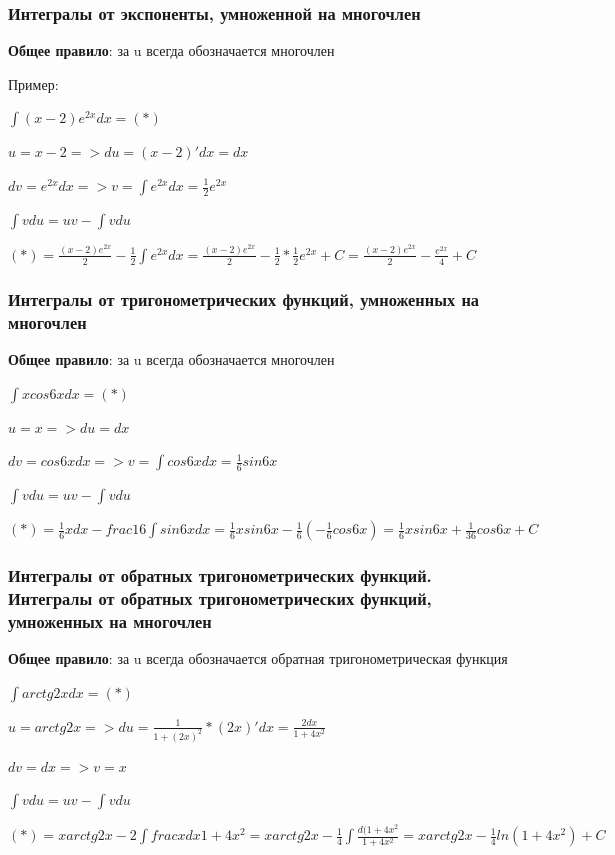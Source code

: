 \documentclass[12pt,a4paper]{article}
\begin{document}
\subsubsection{Интегралы от экспоненты, умноженной на многочлен}

\textbf{Общее правило}: за u всегда обозначается многочлен

Пример:

$\int{(x-2)e^{2x}dx} = (*) $

$ u = x-2 => du = (x-2)'dx = dx $

$ dv = e^{2x}dx => v = \int{e^{2x}dx} = \frac{1}{2}e^{2x} $

$ \int{vdu} = uv - \int{vdu} $

$ (*) = \frac{(x-2)e^{2x}}{2} - \frac{1}{2}\int{e^{2x}}dx = \frac{(x-2)e^{2x}}{2} - \frac{1}{2}* \frac{1}{2}e^{2x} + C 
= \frac{(x-2)e^{2x}}{2} - \frac{e^{2x}}{4} + C $

\subsubsection{Интегралы от тригонометрических функций, умноженных на многочлен}

\textbf{Общее правило}: за u всегда обозначается многочлен

$ \int{x cos6xdx} = (*) $ 

$ u = x => du = dx $

$ dv = cos6xdx => v = \int{cos6xdx} = \frac{1}{6}sin6x $

$ \int{vdu} = uv - \int{vdu} $

$ (*) = \frac{1}{6}xdx - frac{1}{6}\int{sin6xdx} 
= \frac{1}{6}xsin6x-\frac{1}{6}(-\frac{1}{6}cos6x) 
= \frac{1}{6}xsin6x+\frac{1}{36}cos6x+C $

\subsubsection{Интегралы от обратных тригонометрических функций. Интегралы от обратных тригонометрических функций, умноженных на многочлен}

\textbf{Общее правило}: за u всегда обозначается обратная тригонометрическая функция

$ \int{arctg2xdx} = (*) $ 

$ u = arctg2x => du = \frac{1}{1+(2x)^2} * (2x)'dx = \frac{2dx}{1+4x^2} $

$ dv = dx => v = x $

$ \int{vdu} = uv - \int{vdu} $

$ (*) =	xarctg2x - 2 \int frac{xdx}{1+4x^2} 
= xarctg2x - \frac{1}{4}\int\frac{d(1+4x^2}{1+4x^2}
= xarctg2x - \frac{1}{4}ln(1+4x^2) + C $
\end{document}
